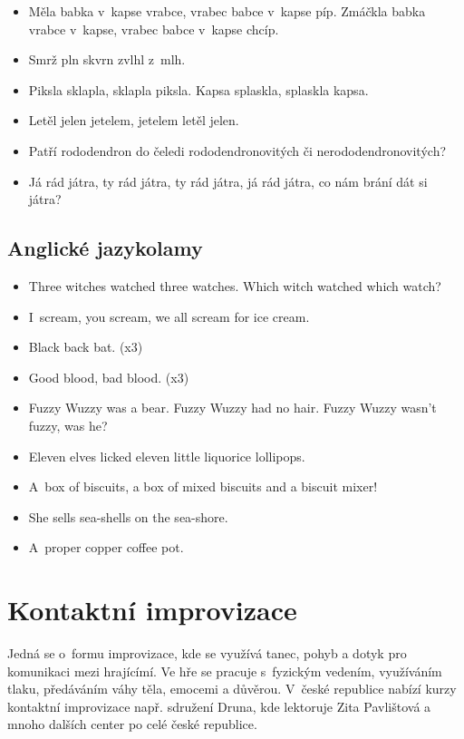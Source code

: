 \begin{itemize}
\item  Měla babka v~kapse vrabce, vrabec babce v~kapse píp. Zmáčkla babka vrabce v~kapse, vrabec babce v~kapse chcíp.
\item  Smrž pln skvrn zvlhl z~mlh.
\item  Piksla sklapla, sklapla piksla. Kapsa splaskla, splaskla kapsa.
\item  Letěl jelen jetelem, jetelem letěl jelen.
\item  Patří rododendron do čeledi rododendronovitých či nerododendronovitých?
\item  Já rád játra, ty rád játra, ty rád játra, já rád játra, co nám brání dát si játra?
\end{itemize}
 
\subsection{ Anglické jazykolamy }  
\begin{itemize}
\item  Three witches watched three watches. Which witch watched which watch?
\item  I~scream, you scream, we all scream for ice cream.
\item  Black back bat. (x3)
\item  Good blood, bad blood. (x3)
\item  Fuzzy Wuzzy was a bear. Fuzzy Wuzzy had no hair. Fuzzy Wuzzy wasn’t fuzzy, was he?
\item  Eleven elves licked eleven little liquorice lollipops.
\item  A~box of biscuits, a box of mixed biscuits and a biscuit mixer!
\item  She sells sea-shells on the sea-shore.
\item  A~proper copper coffee pot.
\end{itemize}
 
 
\needspace{5cm} \section{Kontaktní improvizace} \label{kontaktní improvizace} Jedná se o~formu improvizace, kde se využívá tanec, pohyb a dotyk pro komunikaci mezi hrajícímí. Ve hře se pracuje s~fyzickým vedením, využíváním tlaku, předáváním váhy těla, emocemi a důvěrou. V~české republice nabízí  kurzy kontaktní improvizace např. sdružení Druna, kde lektoruje Zita Pavlištová a mnoho dalších center po celé české republice. 
 

